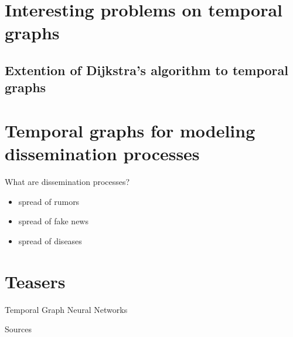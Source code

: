 \documentclass{beamer}
\begin{document}
\section{Interesting problems on temporal graphs}
\subsection{Extention of Dijkstra's algorithm to temporal graphs}

\section{Temporal graphs for modeling dissemination processes}
\begin{frame}{What are dissemination processes?}
  \begin{itemize}
    \item spread of rumors
    \item spread of fake news
    \item spread of diseases
  \end{itemize}
\end{frame}

\section{Teasers}
\begin{frame}{Temporal Graph Neural Networks}
\end{frame}

\begin{frame}{Sources}
  
  
\end{frame}
\end{document}
